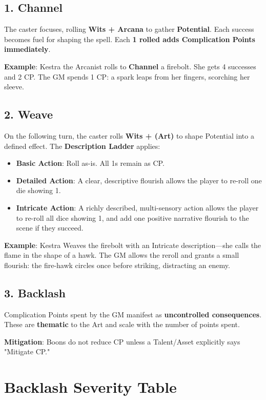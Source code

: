 \subsection*{1. Channel}

The caster focuses, rolling \textbf{Wits + Arcana} to gather \textbf{Potential}. Each success becomes fuel for shaping the spell. Each \textbf{1 rolled adds Complication Points immediately}.

\textbf{Example}: Kestra the Arcanist rolls to \textbf{Channel} a firebolt. She gets 4 successes and 2 CP. The GM spends 1 CP: a spark leaps from her fingers, scorching her sleeve.

\subsection*{2. Weave}

On the following turn, the caster rolls \textbf{Wits + (Art)} to shape Potential into a defined effect. The \textbf{Description Ladder} applies:

\begin{itemize}
    \item \textbf{Basic Action}: Roll as-is. All 1s remain as CP.
    \item \textbf{Detailed Action}: A clear, descriptive flourish allows the player to re-roll one die showing 1.
    \item \textbf{Intricate Action}: A richly described, multi-sensory action allows the player to re-roll all dice showing 1, and add one positive narrative flourish to the scene if they succeed.
\end{itemize}

\textbf{Example}: Kestra Weaves the firebolt with an Intricate description—she calls the flame in the shape of a hawk. The GM allows the reroll and grants a small flourish: the fire-hawk circles once before striking, distracting an enemy.

\subsection*{3. Backlash}

Complication Points spent by the GM manifest as \textbf{uncontrolled consequences}. These are \textbf{thematic} to the Art and scale with the number of points spent.

\textbf{Mitigation}: Boons do not reduce CP unless a Talent/Asset explicitly says "Mitigate CP."

\section*{Backlash Severity Table}

